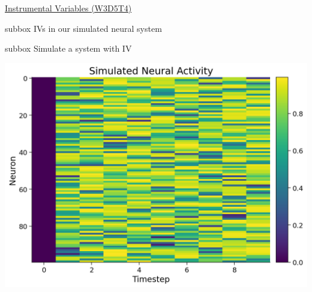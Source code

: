 \begin{textbox}{\href{https://compneuro.neuromatch.io/tutorials/W3D5_NetworkCausality/student/W3D5_Tutorial4.html}{Instrumental Variables (W3D5T4)}   }
\begin{subbox}{subbox}{ IVs in our simulated neural system
}
\begin{center}
\end{center}
\end{subbox}
\begin{subbox}{subbox}{  Simulate a system with IV
}
\scriptsize

\begin{center}
    
\includegraphics[scale=0.2]{Figures/NC/NC_Figure20.png}

\end{center}
\end{subbox}

\end{textbox}
